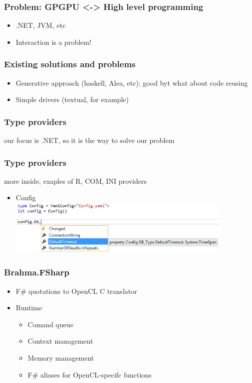 \documentclass[xcolor=table]{beamer}
\begin{document}
\begin{frame}[fragile]
  \transwipe[direction=90]
  \frametitle{Problem: GPGPU <-> High level programming}
  \begin{itemize}
   \item .NET, JVM, etc
   \item Interaction is a problem!
  \end{itemize}
\end{frame}

\begin{frame}[fragile]
  \transwipe[direction=90]
  \frametitle{Existing solutions and problems}
  \begin{itemize}
  \item Generative approach (haskell, Alea, etc): good byt what about code reusing
  \item Simple drivers (textual, for example)
  \end{itemize}
\end{frame}

\begin{frame}
  \transwipe[direction=90]
  \frametitle{Type providers}
  our focus is .NET, so it is the way to solve our problem
\end{frame}

\begin{frame}
  \transwipe[direction=90]
  \frametitle{Type providers}
  more inside, exaples of R, COM, INI providers
  \begin{itemize}
    \item Config \\
     {\includegraphics[width=0.85\textwidth]{pictures/YamlConfigProvider.png}}
  \end{itemize}
\end{frame}

\begin{frame}[fragile]
  \transwipe[direction=90]
  \frametitle{Brahma.FSharp}
  \begin{itemize}
  \item F\# quotations to OpenCL C translator
  \item Runtime
      \begin{itemize}
        \item Comand queue
        \item Context management
        \item Memory management
        \item F\# aliases for OpenCL-specifc functions
      \end{itemize}

  \end{itemize}
\end{frame}
\end{document}
